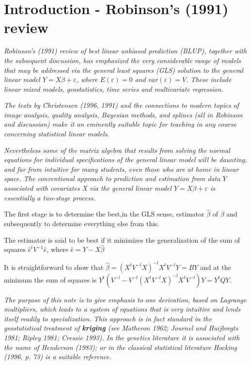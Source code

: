 \documentclass[Main.tex]{subfiles}
\begin{document}
\section{Introduction - Robinson's (1991) review}
\emph{ Robinson's (1991) review of best linear unbiased prediction (BLUP), together with the subsequent discussion, has emphasized the very considerable range of models that may be addressed via the general least squares (GLS) solution to the general linear model $Y = X\beta + \varepsilon$, where $E(\varepsilon) = 0$ and $var(\varepsilon) = V$. These include linear mixed models, geostatistics, time series and multivariate regression.}


\emph{ The texts by Christensen (1996, 1991) and the connections to modern topics of image analysis, quality analysis, Bayesian methods, and splines (all in Robinson and discussion) make it an eminently suitable topic for teaching in any course concerning statistical linear models. }

\bigskip 
\emph{Nevertheless some of the matrix algebra that results from solving the normal equations for individual specifications of the general linear model will be daunting, and far from intuitive for many students, even those who are at home in linear space. The conventional approach to prediction and estimation from data $Y$ associated with covariates X via the general linear model $Y = X\beta + \varepsilon$ is essentially a two-stage process.}

The first stage is to determine the best,in the GLS sense, estimator $\hat{\beta}$ of $\beta$ and subsequently to determine everything else from this.

The estimator is said to be best if it minimizes the generalization of the sum of squares $\hat{e}^{t}V^{-1}\hat{e}$, where $\hat{e} = Y- X\hat{\beta}$



It is straightforward to show that $\hat{\beta} = (X^tV^{-l}X)^{-l}X^tV^{-l}Y = BY$ and at the minimum the sum of squares is $Y^{t} (V^{-l}  - V^{-l}(X^tV^{-l}X)^{-l}X^tV^{-l})Y = Y^{t}QY$.\\
\bigskip

\emph{The purpose of this note is to give emphasis to one derivation, based on Lagrange multipliers, which leads to a system of equations that is very intuitive and lends itself readily to specialization. This approach is in fact standard in the geostatistical treatment of \textbf{kriging} (see Matheron 1962; Journel and Huijbregts 1981; Ripley 1981; Cressie 1993). In the genetics literature it is associated with the name of Henderson (1983); or in the classical statistical literature Hocking (1996, p. 73) is a suitable reference.}
\end{document}
